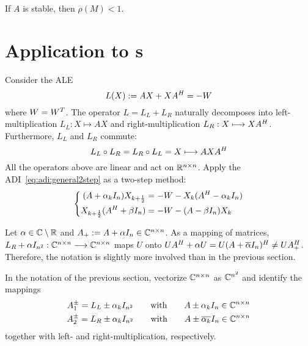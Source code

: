 \begin{hypothesis}
\label{thm:adi:convergence}
  If $A$ is stable, then $\rho(M) < 1$.
\end{hypothesis}

\section{Application to s}
\label{sec:adi:ale}

Consider the \ac{ALE}
\begin{equation*}
\label{eq:adi:ale}
  L(X) := AX + XA^H = -W
\end{equation*}
where $W = W^T$.
The \Lyapunov operator $L = L_L + L_R$ naturally decomposes into
left-multiplication $L_L : X \mapsto AX$ and
right-multiplication $L_R : X \longmapsto XA^H$.
Furthermore, $L_L$ and $L_R$ commute:
\begin{equation*}
  L_L \circ L_R = L_R \circ L_L = X \longmapsto AXA^H
\end{equation*}
All the operators above are linear and act on $\mathbb{R}^{n\times n}$.
Apply the \ac{ADI}~\eqref{eq:adi:general2step} as a two-step method:
\begin{equation}
  \left\{
  \begin{aligned}
    (A + \alpha_k I_n) X_{k+\frac{1}{2}} &= -W - X_k (A^H - \alpha_k I_n) \\
    X_{k+\frac{1}{2}} (A^H + \beta I_n) &= -W - (A - \beta I_n) X_k
  \end{aligned}
  \right.
\end{equation}

\begin{remark}
  Let $\alpha\in\mathbb{C}\setminus\mathbb{R}$ and $A_+ := A+\alpha I_n \in\mathbb{C}^{n\times n}$.
  As a mapping of matrices,
  $L_R + \alpha I_{n^2} : \mathbb{C}^{n\times n} \longrightarrow \mathbb{C}^{n\times n}$ maps $U$ onto
  $
    U A^\HT + \alpha U =
    U(A+\conj{\alpha} I_n)^\HT \neq
    U A_+^\HT
  $.
  Therefore, the notation is slightly more involved than in the previous section.

  In the notation of the previous section,
  vectorize $\mathbb{C}^{n\times n}$ as $\mathbb{C}^{n^2}$ and identify the mappings
  \begin{gather*}
    A_1^\pm = L_L \pm \alpha_k I_{n^2}
    \qquad\text{with}\qquad
    A \pm \alpha_k I_n \in\Cnn \\
    A_2^\pm = L_R \pm \alpha_k I_{n^2}
    \qquad\text{with}\qquad
    A \pm \conj{\alpha_k} I_n \in\Cnn
  \end{gather*}
  together with left- and right-multiplication, respectively.
\end{remark}

